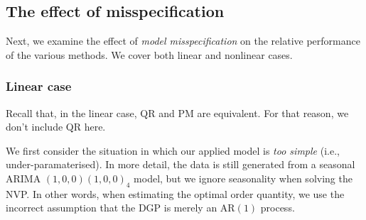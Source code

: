\documentclass{article}
\begin{document}
\subsection{The effect of misspecification} \label{sub:exp3}

Next, we examine the effect of
\emph{model misspecification} on the relative performance of the various methods. We cover both linear and nonlinear cases.

\subsubsection{Linear case}

Recall that, in the linear case, QR and PM are equivalent. For that reason, we don't include QR here.

We first consider the situation in which our applied model is \emph{too simple} (i.e., under-paramaterised).
In more detail, the data is still generated from a seasonal ARIMA $(1,0,0)(1,0,0)_4$ model, but we ignore seasonality when solving the NVP. In other words, when estimating the optimal order quantity, we use the incorrect assumption that the DGP is merely an AR$(1)$ process.
\end{document}
